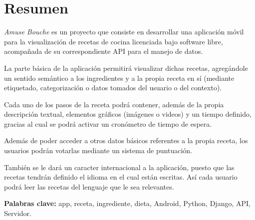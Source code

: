 \section*{Resumen}

\textit{Amuse Bouche} es un proyecto que consiste en desarrollar una aplicación
móvil para la visualización de recetas de cocina licenciada bajo software libre,
acompañada de su correspondiente API para el manejo de datos.

La parte básica de la aplicación permitirá visualizar dichas recetas, agregándole
un sentido semántico a los ingredientes y a la propia receta en sí (mediante
etiquetado, categorización o datos tomados del usuario o del contexto).

Cada uno de los pasos de la receta podrá contener, además de la propia descripción
textual, elementos gráficos (imágenes o videos) y un tiempo definido, gracias al
cual se podrá activar un cronómetro de tiempo de espera.

Además de poder acceder a otros datos básicos referentes a la propia receta, los
usuarios podrán votarlas mediante un sistema de puntuación.

También se le dará un caracter internacional a la aplicación, puesto que las
recetas tendrán definido el idioma en el cual están escritas. Así cada usuario
podrá leer las recetas del lenguaje que le sea relevantes.

\textbf{Palabras clave:} app, receta, ingrediente, dieta, Android, Python,
Django, API, Servidor.
